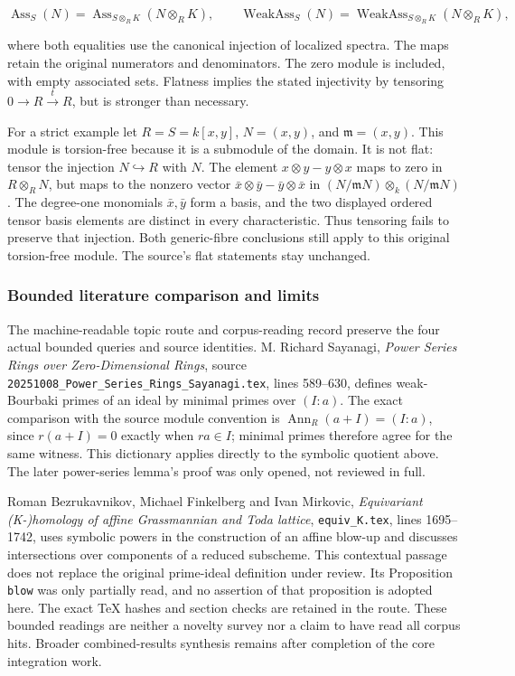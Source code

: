 \[
\operatorname{Ass}_S(N)=\operatorname{Ass}_{S\otimes_RK}(N\otimes_RK),\qquad
\operatorname{WeakAss}_S(N)=\operatorname{WeakAss}_{S\otimes_RK}(N\otimes_RK),
\]

where both equalities use the canonical injection of localized spectra. The maps retain the original numerators and denominators. The zero module is included, with empty associated sets. Flatness implies the stated injectivity by tensoring \(0\to R\xrightarrow{t}R\), but is stronger than necessary.

For a strict example let \(R=S=k[x,y]\), \(N=(x,y)\), and \(\mathfrak m=(x,y)\). This module is torsion-free because it is a submodule of the domain. It is not flat: tensor the injection \(N\hookrightarrow R\) with \(N\). The element \(x\otimes y-y\otimes x\) maps to zero in \(R\otimes_RN\), but maps to the nonzero vector \(\bar x\otimes\bar y-\bar y\otimes\bar x\) in \((N/\mathfrak mN)\otimes_k(N/\mathfrak mN)\). The degree-one monomials \(\bar x,\bar y\) form a basis, and the two displayed ordered tensor basis elements are distinct in every characteristic. Thus tensoring fails to preserve that injection. Both generic-fibre conclusions still apply to this original torsion-free module. The source's flat statements stay unchanged.

\subsubsection{Bounded literature comparison and limits}\label{algebra-proof-005-bounded-literature-comparison-and-limits}

The machine-readable topic route and corpus-reading record preserve the four actual bounded queries and source identities. M. Richard Sayanagi, \emph{Power Series Rings over Zero-Dimensional Rings}, source \texttt{20251008\_\allowbreak{}Power\_\allowbreak{}Series\_\allowbreak{}Rings\_\allowbreak{}Sayanagi.\allowbreak{}tex}, lines 589--630, defines weak-Bourbaki primes of an ideal by minimal primes over \((I:a)\). The exact comparison with the source module convention is \(\operatorname{Ann}_R(a+I)=(I:a)\), since \(r(a+I)=0\) exactly when \(ra\in I\); minimal primes therefore agree for the same witness. This dictionary applies directly to the symbolic quotient above. The later power-series lemma's proof was only opened, not reviewed in full.

Roman Bezrukavnikov, Michael Finkelberg and Ivan Mirkovic, \emph{Equivariant (K-)homology of affine Grassmannian and Toda lattice}, \texttt{equiv\_K.tex}, lines 1695--1742, uses symbolic powers in the construction of an affine blow-up and discusses intersections over components of a reduced subscheme. This contextual passage does not replace the original prime-ideal definition under review. Its Proposition \texttt{blow} was only partially read, and no assertion of that proposition is adopted here. The exact TeX hashes and section checks are retained in the route. These bounded readings are neither a novelty survey nor a claim to have read all corpus hits. Broader combined-results synthesis remains after completion of the core integration work.

